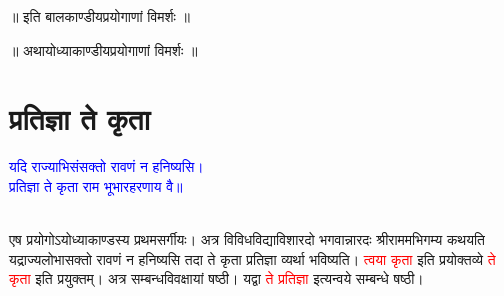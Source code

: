 \vspace{2mm}
\centering ॥ इति बालकाण्डीयप्रयोगाणां विमर्शः ॥\nopagebreak\\
\vspace{4mm}
{}
\centering ॥ अथायोध्याकाण्डीयप्रयोगाणां विमर्शः ॥\nopagebreak\\
\section[प्रतिज्ञा ते कृता]{प्रतिज्ञा ते कृता}
\centering\textcolor{blue}{यदि राज्याभिसंसक्तो रावणं न हनिष्यसि।\nopagebreak\\
प्रतिज्ञा ते कृता राम भूभारहरणाय वै॥}\nopagebreak\\
\\
\begin{sloppypar}\justifying\noindent\hspace{10mm} एष प्रयोगोऽयोध्या\-काण्डस्य प्रथम\-सर्गीयः। अत्र विविध\-विद्या\-विशारदो भगवान्नारदः श्रीराममभिगम्य कथयति यद्राज्य\-लोभासक्तो रावणं न हनिष्यसि तदा ते कृता प्रतिज्ञा व्यर्था भविष्यति। \textcolor{red}{त्वया कृता} इति प्रयोक्तव्ये \textcolor{red}{ते कृता} इति प्रयुक्तम्। अत्र सम्बन्ध\-विवक्षायां षष्ठी। यद्वा \textcolor{red}{ते प्रतिज्ञा} इत्यन्वये सम्बन्धे षष्ठी।\end{sloppypar}
